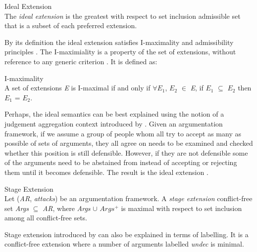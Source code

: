 \begin{definition}{Ideal Extension}
\label{def:idealExtension}\\
The \textit{ideal extension} is the greatest with respect to set inclusion admissible set that is a subset of each preferred extension.
\end{definition}

By its definition the ideal extension satisfies I-maximality and admissibility principles \citep{baroni2009semantics}. The I-maximiality is a property of the set of extensions, without reference to any generic criterion \citep{dunne2006computational}. It is defined as:

\begin{definition}{I-maximality}
\label{def:IMaximality}\\
A set of extensions \textit{E} is I-maximal if and only if $\forall$\textit{$E_1$}, \textit{$E_2$} $\in$ \textit{E}, if \textit{$E_1$} $\subseteq$ \textit{$E_2$} then \textit{$E_1$} = \textit{$E_2$}.
\end{definition}

Perhaps, the ideal semantics can be best explained using the notion of a judgement aggregation context introduced by \citet{caminada2011judgment}. Given an argumentation framework, if we assume a group of people whom all try to accept as many as possible of sets of arguments, they all agree on needs to be examined and checked whether this position is still defensible. However, if they are not defensible some of the arguments need to be abstained from instead of accepting or rejecting them until it becomes defensible. The result is the ideal extension \citep{baroni2011introduction}.

\begin{definition}{Stage Extension}
\label{def:stageExtension}\\
Let (\textit{AR}, \textit{attacks}) be an argumentation framework. A \textit{stage extension} conflict-free set \textit{Args} $\subseteq$ \textit{AR}, where \textit{Args} $\cup$ \textit{$Args^+$} is maximal with respect to set inclusion among all conflict-free sets.
\end{definition}

Stage extension introduced by \citet{verheij1996two} can also be explained in terms of labelling. It is a conflict-free extension where a number of arguments labelled \textit{undec} is minimal. 
\newline

